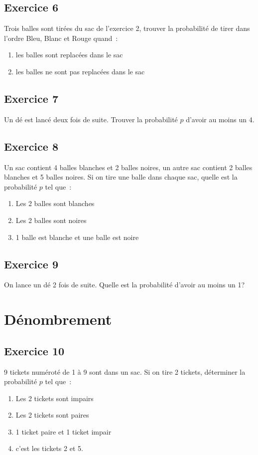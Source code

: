 \documentclass[]{book}
\theoremstyle{definition}
\begin{document}
\subsection*{Exercice 6}
Trois balles sont tir\'ees du sac de l'exercice 2, trouver la probabilit\'e de tirer dans l'ordre Bleu, Blanc et Rouge quand\ : 
\begin{enumerate}
\item les balles sont replac\'ees dans le sac
\item les balles ne sont pas replac\'ees dans le sac
\end{enumerate}

\subsection*{Exercice 7}
Un d\'e est lanc\'e deux fois de suite. Trouver la probabilit\'e $p$ d'avoir au moins un 4.

\subsection*{Exercice 8}
Un sac contient 4 balles blanches et 2 balles noires, un autre sac contient 2 balles blanches et 5 balles noires. Si on tire une balle dans chaque sac, quelle est la probabilit\'e $p$ tel que\ :
\begin{enumerate}
\item Les 2 balles sont blanches
\item Les 2 balles sont noires
\item 1 balle est blanche et une balle est noire
\end{enumerate}

\subsection*{Exercice 9}
On lance un d\'e 2 fois de suite. Quelle est la probabilit\'e d'avoir au moins un 1?

\section*{D\'enombrement}
\subsection*{Exercice 10}
9 tickets num\'erot\'e de 1 \`a 9 sont dans un sac. Si on tire 2 tickets, d\'eterminer la probabilit\'e $p$ tel que\ :
\begin{enumerate}
\item Les 2 tickets sont impairs
\item Les 2 tickets sont paires
\item 1 ticket paire et 1 ticket impair
\item c'est les tickets 2 et 5.
\end{enumerate}
\end{document}

